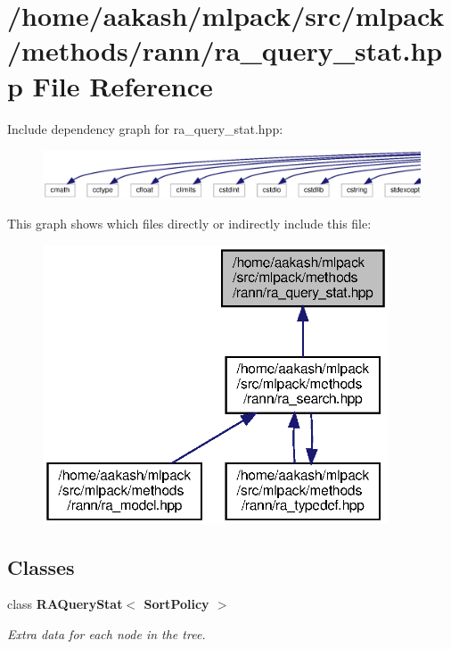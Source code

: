 \section{/home/aakash/mlpack/src/mlpack/methods/rann/ra\+\_\+query\+\_\+stat.hpp File Reference}
\label{ra__query__stat_8hpp}
Include dependency graph for ra\+\_\+query\+\_\+stat.\+hpp\+:
\nopagebreak
\begin{figure}[H]
\begin{center}
\leavevmode
\includegraphics[width=350pt]{ra__query__stat_8hpp__incl}
\end{center}
\end{figure}
This graph shows which files directly or indirectly include this file\+:
\nopagebreak
\begin{figure}[H]
\begin{center}
\leavevmode
\includegraphics[width=291pt]{ra__query__stat_8hpp__dep__incl}
\end{center}
\end{figure}
\subsection*{Classes}
\begin{DoxyCompactItemize}
\item 
class \textbf{ R\+A\+Query\+Stat$<$ Sort\+Policy $>$}
\begin{DoxyCompactList}\small\item\em Extra data for each node in the tree. \end{DoxyCompactList}\end{DoxyCompactItemize}
